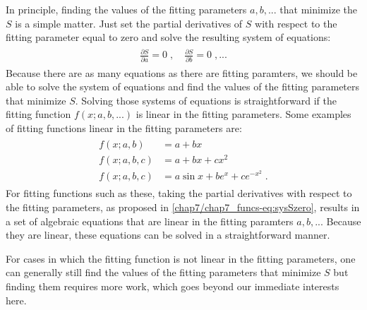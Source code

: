 \documentclass[letterpaper,10pt,english]{sphinxmanual}
\begin{document}
In principle, finding the values of the fitting parameters \(a, b, ...\) that minimize the \(S\) is a simple matter.  Just set the partial derivatives of \(S\) with respect to the fitting parameter equal to zero and solve the resulting system of equations:
\label{chap7/chap7_funcs:equation-eq:sysSzero}\begin{gather}
\begin{split}\frac{\partial S}{\partial a} = 0 \;, \quad
\frac{\partial S}{\partial b} = 0 \;, ...\end{split}\label{chap7/chap7_funcs-eq:sysSzero}
\end{gather}
Because there are as many equations as there are fitting paramters, we should be able to solve the system of equations and find the values of the fitting parameters that minimize \(S\).  Solving those systems of equations is straightforward if the fitting function \(f(x; a, b, ...)\) is linear in the fitting parameters.  Some examples of fitting functions linear in the fitting parameters are:
\label{chap7/chap7_funcs:equation-eq:fitfuncs}\begin{gather}
\begin{split}f(x; a, b) &= a + bx \\
f(x; a, b, c) &= a + bx + cx^2 \\
f(x; a, b, c) &= a \sin x + b e^x + c e^{-x^2} \;.\end{split}\label{chap7/chap7_funcs-eq:fitfuncs}
\end{gather}
For fitting functions such as these, taking the partial derivatives with respect to the fitting parameters, as proposed in \eqref{chap7/chap7_funcs-eq:sysSzero}, results in a set of algebraic equations that are linear in the fitting paramters \(a, b, ...\) Because they are linear, these equations can be solved in a straightforward manner.

For cases in which the fitting function is not linear in the fitting parameters, one can generally still find the values of the fitting parameters that minimize \(S\) but finding them requires more work, which goes beyond our immediate interests here.
\end{document}
